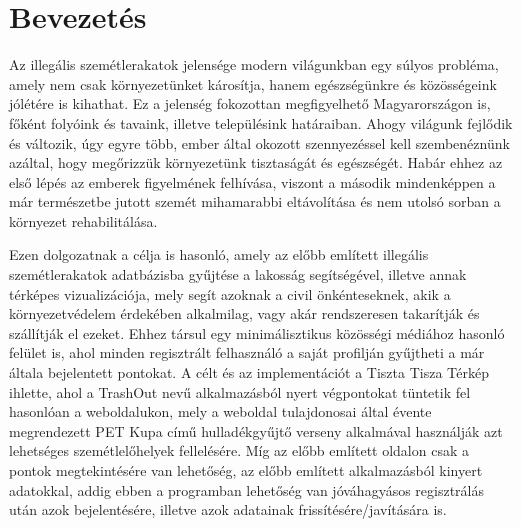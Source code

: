 \chapter{Bevezetés}
\label{ch:intro}

Az illegális szemétlerakatok jelensége modern világunkban egy súlyos probléma, amely nem csak környezetünket károsítja, hanem egészségünkre és közösségeink jólétére is kihathat. Ez a jelenség fokozottan megfigyelhető Magyarországon is, főként folyóink és tavaink, illetve településink határaiban. Ahogy világunk fejlődik és változik, úgy egyre több, ember által okozott szennyezéssel kell szembenéznünk azáltal, hogy megőrizzük környezetünk tisztaságát és egészségét. Habár ehhez az első lépés az emberek figyelmének felhívása, viszont a második mindenképpen a már természetbe jutott szemét mihamarabbi eltávolítása és nem utolsó sorban a környezet rehabilitálása.\par
Ezen dolgozatnak a célja is hasonló, amely az előbb említett illegális szemétlerakatok adatbázisba gyűjtése a lakosság segítségével, illetve annak térképes vizualizációja, mely segít azoknak a civil önkénteseknek, akik a környezetvédelem érdekében alkalmilag, vagy akár rendszeresen takarítják és szállítják el ezeket. Ehhez társul egy minimálisztikus közösségi médiához hasonló felület is, ahol minden regisztrált felhasználó a saját profilján gyűjtheti a már általa bejelentett pontokat. A célt és az implementációt a Tiszta Tisza Térkép ihlette, ahol a TrashOut nevű alkalmazásból nyert végpontokat tüntetik fel hasonlóan a weboldalukon, mely a weboldal tulajdonosai által évente megrendezett PET Kupa című hulladékgyűjtő verseny alkalmával használják azt lehetséges szemétlelőhelyek fellelésére. Míg az előbb említett oldalon csak a pontok megtekintésére van lehetőség, az előbb említett alkalmazásból kinyert adatokkal, addig ebben a programban lehetőség van jóváhagyásos regisztrálás után azok bejelentésére, illetve azok adatainak frissítésére/javítására is.
\newpage